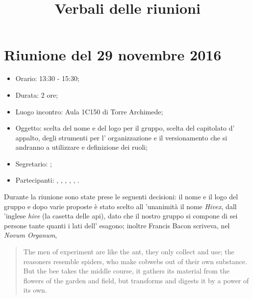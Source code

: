 


\author{\PB}
\supervisor{\GG}
\title{Verbali delle riunioni}



\maketitle



\section{Riunione del 29 novembre 2016}

\begin{itemize}
	\item Orario: 13:30 - 15:30;
	\item Durata: 2 ore;
	\item Luogo incontro: Aula 1C150 di Torre Archimede; 
	\item Oggetto: scelta del nome e del logo per il gruppo, scelta del capitolato d' appalto, degli strumenti per l' organizzazione e il versionamento che si andranno a utilizzare e definizione dei ruoli;
	\item Segretario: \LB; 
	\item Partecipanti: \AZ, \GG, \LB, \LS, \MM, \PB.
\end{itemize}

Durante la riunione sono state prese le seguenti decisioni:
il nome e il logo del gruppo e dopo varie proposte è stato scelto all 'unanimità il nome \textit{Hivex}, dall 'inglese \textit{hive} (la casetta delle api), dato che il nostro gruppo si compone di sei persone tante quanti i lati dell' esagono; inoltre Francis Bacon scriveva, nel \textit{Novum Organum},
\begin{quote}
	The men of experiment are like the ant, they only collect and use; the reasoners resemble spiders, who make cobwebs out of their own substance. But the bee takes the middle course, it gathers its material from the flowers of the garden and field, but transforms and digests it by a power of its own.
\end{quote}

